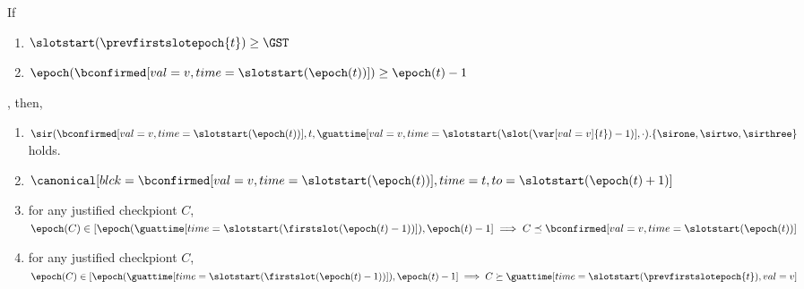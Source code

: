 \documentclass{article}
\begin{document}
\begin{lemma}\label{lem:confirmed-end-first-slot-canonical}
    If
    \begin{enumerate}
        \item $\slotstart(\prevfirstslotepoch{t})\geq \GST$
        \item $\epoch(\bconfirmed[val=v,time=\slotstart(\epoch(t))])\geq\epoch(t)-1$
    \end{enumerate},
    then, 
    \begin{enumerate}
        \item  $\sir(\bconfirmed[val=v,time=\slotstart(\epoch(t))],t,\guattime[val=v,time={\slotstart(\slot(\var[val=v]{t})-1)}],\cdot).\{\sirone,\sirtwo,\sirthree\}$ holds.
        \item $\canonical[blck={\bconfirmed[val=v,time=\slotstart(\epoch(t))]},time=t,to=\slotstart(\epoch(t)+1)]$
        \item for any justified checkpiont $C$, $\epoch(C) \in [\epoch(\guattime[time=\slotstart(\firstslot(\epoch(t)-1))]),\epoch(t)-1] \implies C  \preceq \bconfirmed[val=v,time=\slotstart(\epoch(t))]$
        \item   for any justified checkpiont $C$, $\epoch(C) \in [\epoch(\guattime[time=\slotstart(\firstslot(\epoch(t)-1))]),\epoch(t)-1] \implies C  \succeq \guattime[time=\slotstart(\prevfirstslotepoch{t}),val=v]$
    \end{enumerate}
\end{lemma}
\end{document}
